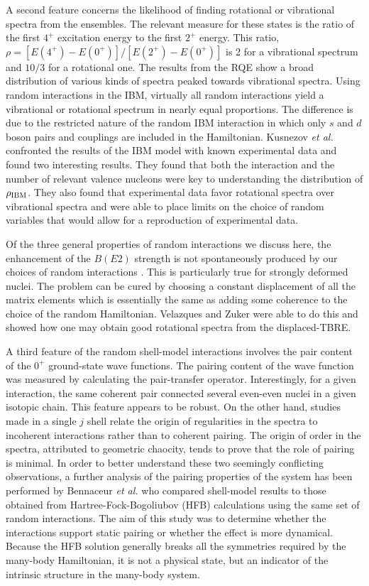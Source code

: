 \documentclass[rmp,aps,floatfix]{revtex4}
\begin{document}
A second feature concerns the likelihood of finding rotational or vibrational
spectra from the ensembles. The relevant measure for these states is the
ratio of the first $4^+$ excitation energy to the first $2^+$ energy. This
ratio, $\rho=[E(4^+)-E(0^+)]/[E(2^+)-E(0^+)]$ 
is 2 for a vibrational spectrum and $10/3$ for
a rotational one. The results from the RQE show a broad distribution
of various kinds of spectra peaked towards vibrational spectra.  
Using random interactions in the IBM,
virtually all random interactions yield a vibrational or rotational spectrum
in nearly equal proportions.  
The difference is due to the restricted nature of the random IBM interaction 
in which only $s$ and $d$ boson pairs and couplings are included in the 
Hamiltonian.  Kusnezov {\em et al.} \cite{kzc00} confronted the 
results of the IBM model with known experimental data 
and found two interesting results. They found
that both the interaction and the number of relevant valence nucleons
were key to understanding the distribution of $\rho_{\rm IBM}$. They also
found that experimental data favor rotational spectra over vibrational
spectra and were able to place limits on the choice of random variables
that would allow for a reproduction of experimental data. 

Of the three general properties of random interactions we discuss here, 
the enhancement of the $B(E2)$ strength is not spontaneously produced by
our choices of random interactions \cite{horoi01}. This is particularly
true for strongly deformed nuclei. 
The problem can be cured \cite{vz02} by
choosing a constant displacement of all the matrix elements which is 
essentially the same as adding some coherence to the choice of the random
Hamiltonian. Velazques and Zuker \cite{vz02} were able to do this and 
showed how one may obtain good rotational spectra from the displaced-TBRE. 

A third feature of the random shell-model interactions involves the pair 
content of the $0^+$ ground-state wave functions. The pairing content of
the wave function was measured by calculating the pair-transfer operator. 
Interestingly, for a given interaction, the same coherent pair connected
several even-even nuclei in a given isotopic chain. This feature appears
to be robust.  On the other hand, studies \cite{mulhall00} 
made in a single $j$ shell relate the origin of regularities in 
the spectra to incoherent interactions
rather than to coherent pairing. The origin of order in the spectra,
attributed to geometric chaocity,
tends to prove that the role of pairing is minimal.
In order to better understand these two seemingly conflicting
observations, a further analysis of the pairing properties of 
the system has been performed by Bennaceur {\em et al.} \cite{ben02}
who compared shell-model results to those obtained 
from Hartree-Fock-Bogoliubov (HFB) calculations using the same set of
random interactions. 
The aim of this study was to determine whether
the interactions support static pairing or whether the effect is 
more dynamical.  Because the HFB solution generally breaks all the 
symmetries required by the many-body Hamiltonian, it is not a 
physical state, but an indicator of the intrinsic structure in 
the many-body system.  
\end{document}
